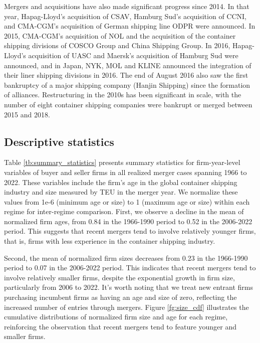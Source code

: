 \documentclass[10pt]{article}
\begin{document}
Mergers and acquisitions have also made significant progress since 2014. In that year, Hapag-Lloyd's acquisition of CSAV, Hamburg Sud's acquisition of CCNI, and CMA-CGM's acquisition of German shipping line ODPR were announced. In 2015, CMA-CGM's acquisition of NOL and the acquisition of the container shipping divisions of COSCO Group and China Shipping Group. In 2016, Hapag-Lloyd's acquisition of UASC and Maersk's acquisition of Hamburg Sud were announced, and in Japan, NYK, MOL and KLINE announced the integration of their liner shipping divisions in 2016. The end of August 2016 also saw the first bankruptcy of a major shipping company (Hanjin Shipping) since the formation of alliances. Restructuring in the 2010s has been significant in scale, with the number of eight container shipping companies were bankrupt or merged between 2015 and 2018.





\subsection{Descriptive statistics}\label{sec:descriptive_statistics}

Table \ref{tb:summary_statistics} presents summary statistics for firm-year-level variables of buyer and seller firms in all realized merger cases spanning 1966 to 2022. 
These variables include the firm's age in the global container shipping industry and size measured by TEU in the merger year. 
We normalize these values from 1e-6 (minimum age or size) to 1 (maximum age or size) within each regime for inter-regime comparison.
First, we observe a decline in the mean of normalized firm ages, from 0.84 in the 1966-1990 period to 0.52 in the 2006-2022 period. 
This suggests that recent mergers tend to involve relatively younger firms, that is, firms with less experience in the container shipping industry.

Second, the mean of normalized firm sizes decreases from 0.23 in the 1966-1990 period to 0.07 in the 2006-2022 period.
This indicates that recent mergers tend to involve relatively smaller firms, despite the exponential growth in firm size, particularly from 2006 to 2022.
It's worth noting that we treat new entrant firms purchasing incumbent firms as having an age and size of zero, reflecting the increased number of entries through mergers.
Figure \ref{fg:size_cdf} illustrates the cumulative distributions of normalized firm size and age for each regime, reinforcing the observation that recent mergers tend to feature younger and smaller firms.
\end{document}
